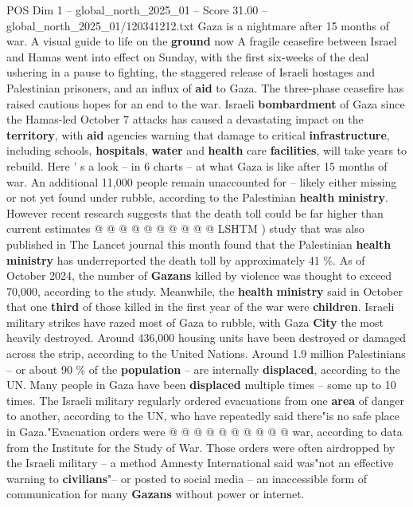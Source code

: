 \begin{textsample}{POS Dim 1 – global\_north\_2025\_01 – Score 31.00 – global\_north\_2025\_01/120341212.txt}  \label{ex:f1_pos_368}
Gaza is a nightmare after 15 months of war.
A visual guide to life on the \textbf{ground} now A fragile ceasefire between Israel and Hamas went into effect on Sunday, with the first six-weeks of the deal ushering in a pause to fighting, the staggered release of Israeli hostages and Palestinian prisoners, and an influx of \textbf{aid} to Gaza.
The three-phase ceasefire has raised cautious hopes for an end to the war.
Israeli \textbf{bombardment} of Gaza since the Hamas-led October 7 attacks has caused a devastating impact on the \textbf{territory}, with \textbf{aid} agencies warning that damage to critical \textbf{infrastructure}, including schools, \textbf{hospitals}, \textbf{water} and \textbf{health} care \textbf{facilities}, will take years to rebuild.
Here ' s a look -- in 6 charts -- at what Gaza is like after 15 months of war.
An additional 11,000 people remain unaccounted for -- likely either missing or not yet found under rubble, according to the Palestinian \textbf{health} \textbf{ministry}.
However recent research suggests that the death toll could be far higher than current estimates @ @ @ @ @ @ @ @ @ @ LSHTM ) study that was also published in The Lancet journal this month found that the Palestinian \textbf{health} \textbf{ministry} has underreported the death toll by approximately 41 \%.
As of October 2024, the number of \textbf{Gazans} killed by violence was thought to exceed 70,000, according to the study.
Meanwhile, the \textbf{health} \textbf{ministry} said in October that one \textbf{third} of those killed in the first year of the war were \textbf{children}.
Israeli military strikes have razed most of Gaza to rubble, with Gaza \textbf{City} the most heavily destroyed.
Around 436,000 housing units have been destroyed or damaged across the strip, according to the United Nations.
Around 1.9 million Palestinians -- or about 90 \% of the \textbf{population} -- are internally \textbf{displaced}, according to the UN.
Many people in Gaza have been \textbf{displaced} multiple times -- some up to 10 times.
The Israeli military regularly ordered evacuations from one \textbf{area} of danger to another, according to the UN, who have repeatedly said there"is no safe place in Gaza."Evacuation orders were @ @ @ @ @ @ @ @ @ @ war, according to data from the Institute for the Study of War.
Those orders were often airdropped by the Israeli military -- a method Amnesty International said was"not an effective warning to \textbf{civilians}"-- or posted to social media -- an inaccessible form of communication for many \textbf{Gazans} without power or internet.

\end{textsample}
